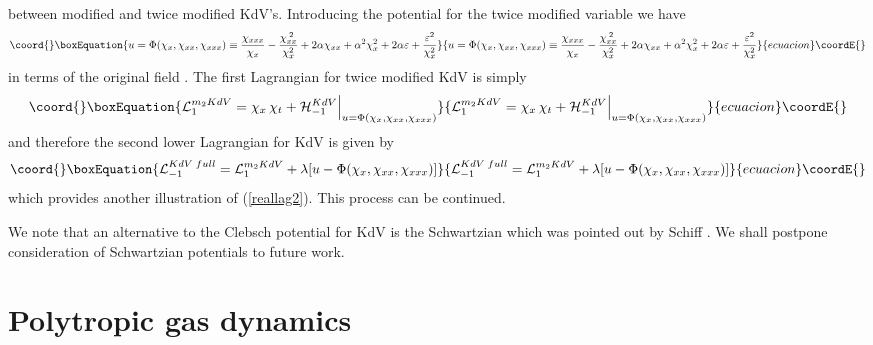 \documentclass[a4paper,12pt]{article}
\begin{document}
between modified and twice modified KdV's. Introducing the
potential for the twice modified variable \coordHE{} we have
\begin{equation}\coord{}\boxEquation{
u = \Phi(\chi_x,\chi_{xx},\chi_{xxx}) \equiv
\frac{\chi_{xxx}}{\chi_x} - \frac{\chi_{xx}^{\;2}}{\chi_x^2} + 2
\alpha \chi_{xx} + \alpha^2 \chi_{x}^2 + 2 \alpha \varepsilon +
\frac{\varepsilon^{2}}{\chi_x^2} \label{uq}
}{
u = \Phi(\chi_x,\chi_{xx},\chi_{xxx}) \equiv
\frac{\chi_{xxx}}{\chi_x} - \frac{\chi_{xx}^{\;2}}{\chi_x^2} + 2
\alpha \chi_{xx} + \alpha^2 \chi_{x}^2 + 2 \alpha \varepsilon +
\frac{\varepsilon^{2}}{\chi_x^2} }{ecuacion}\coordE{}\end{equation}
in terms of the original field \coordHE{}. The first Lagrangian for twice
modified KdV is simply
\begin{equation}\coord{}\boxEquation{
{\cal L}_{1}^{m_2KdV} = \chi_{x} \, \chi_{t} + {\cal H}_{-1}^{KdV}
\Big|_{ u = \Phi(\chi_{x}, \chi_{xx},\chi_{xxx} ) }
\label{mmkdvlag}
}{
{\cal L}_{1}^{m_2KdV} = \chi_{x} \, \chi_{t} + {\cal H}_{-1}^{KdV}
\Big|_{ u = \Phi(\chi_{x}, \chi_{xx},\chi_{xxx} ) }
}{ecuacion}\coordE{}\end{equation}
and therefore the second lower Lagrangian for KdV is given by
\begin{equation}\coord{}\boxEquation{
{\cal L}_{-1}^{KdV \; full} = {\cal L}_1^{m_2KdV}  + \lambda [ u -
\Phi(\chi_{x}, \chi_{xx}, \chi_{xxx} ) ] \label{kdvlagm2}
}{
{\cal L}_{-1}^{KdV \; full} = {\cal L}_1^{m_2KdV}  + \lambda [ u -
\Phi(\chi_{x}, \chi_{xx}, \chi_{xxx} ) ] }{ecuacion}\coordE{}\end{equation}
which provides another illustration of (\ref{reallag2}). This
process can be continued.

We note that an alternative to the Clebsch potential for KdV is
the Schwartzian which was pointed out by Schiff \cite{sch}. We
shall postpone consideration of Schwartzian potentials to future
work.

\section{Polytropic gas dynamics}
\label{sec-gas}
\end{document}

